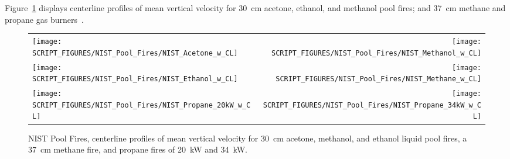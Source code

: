 

Figure~\ref{NIST_Pool_Fires_Velocity_1} displays centerline profiles of mean vertical velocity for 30~cm acetone, ethanol, and methanol pool fires; and 37~cm methane and propane gas burners~\cite{Sung:TN2021}.

\begin{figure}[!h]
\begin{tabular*}{\textwidth}{l@{\extracolsep{\fill}}r}
\texttt{[image: SCRIPT\_FIGURES/NIST\_Pool\_Fires/NIST\_Acetone\_w\_CL]} &
\texttt{[image: SCRIPT\_FIGURES/NIST\_Pool\_Fires/NIST\_Methanol\_w\_CL]} \\
\texttt{[image: SCRIPT\_FIGURES/NIST\_Pool\_Fires/NIST\_Ethanol\_w\_CL]}  &
\texttt{[image: SCRIPT\_FIGURES/NIST\_Pool\_Fires/NIST\_Methane\_w\_CL]} \\
\texttt{[image: SCRIPT\_FIGURES/NIST\_Pool\_Fires/NIST\_Propane\_20kW\_w\_CL]} &
\texttt{[image: SCRIPT\_FIGURES/NIST\_Pool\_Fires/NIST\_Propane\_34kW\_w\_CL]}
\end{tabular*}
\caption[NIST Pool Fires, centerline velocity]{NIST Pool Fires, centerline profiles of mean vertical velocity for 30~cm acetone, methanol, and ethanol liquid pool fires, a 37~cm methane fire, and propane fires of 20~kW and 34~kW.}
\label{NIST_Pool_Fires_Velocity_1}
\end{figure}

